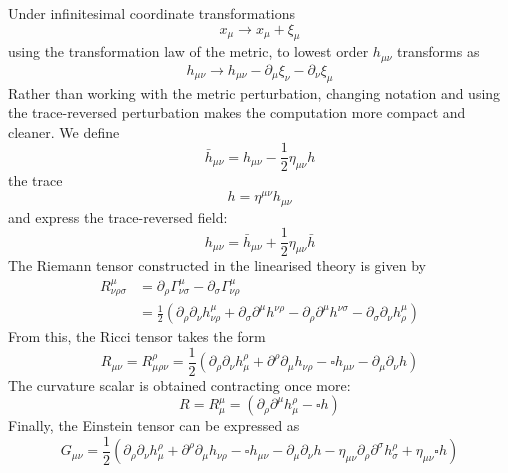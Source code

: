 \documentclass[binding=0.6cm, LaM]{sapthesis}
\begin{document}
	Under infinitesimal coordinate transformations
                 \[
			x_{\mu} \rightarrow x_{\mu} + \xi_{\mu}
                \]
	using the transformation law of the metric, to lowest order $h_{\mu\nu}$ transforms as	
		\[
			h_{\mu\nu} \rightarrow h_{\mu\nu} - \partial_{\mu}\xi_{\nu} - \partial_{\nu}\xi_{\mu}
		\]
	Rather than working with the metric perturbation, changing notation and using the trace-reversed perturbation 
	makes the computation more compact and cleaner. We define
		\begin{equation}
			{\bar h}_{\mu\nu} = h_{\mu\nu} - \frac{1}{2}\eta_{\mu\nu}h
		\end{equation}
	the trace
		\begin{equation}
			h = \eta^{\mu\nu}h_{\mu\nu}
		\end{equation}
	and express the trace-reversed field:
		\begin{equation}
			h_{\mu\nu} = {\bar h}_{\mu\nu} + \frac{1}{2}\eta_{\mu\nu}{\bar h}
		\end{equation}
	The Riemann tensor constructed in the linearised theory is given by
		\begin{align}
			R^{\mu}_{\nu\rho\sigma} &= \partial_{\rho} \Gamma^{\mu}_{\nu\sigma} - \partial_{\sigma}\Gamma^{\mu}_{\nu\rho}  \\
				       &= \frac{1}{2} (\partial_{\rho}\partial_{\nu}h^{\mu}_{\nu\rho} + \partial_{\sigma}\partial^{\mu}h^{\nu\rho} - \partial_{\rho}\partial^{\mu}h^{\nu\sigma} - \partial_{\sigma}\partial_{\nu}h^{\mu}_{\rho})
		\end{align}
	From this, the Ricci tensor takes the form
		\begin{equation}
			R_{\mu\nu} = R^{\rho}_{\mu\rho\nu} = \frac{1}{2}(\partial_{\rho}\partial_{\nu}h^{\rho}_{\mu} + \partial^{\rho}\partial_{\mu}h_{\nu\rho} - \square h_{\mu\nu} - \partial_{\mu}\partial_{\nu}h)
		\end{equation}
	The curvature scalar is obtained contracting once more:
		\begin{equation}
			R = R^{\mu}_{\mu} = (\partial_{\rho}\partial^{\mu}h^{\rho}_{\mu} - \square h)
		\end{equation}
	Finally, the Einstein tensor can be expressed as
		\begin{equation}
			G_{\mu\nu} = \frac{1}{2}(\partial_{\rho}\partial_{\nu}h^{\rho}_{\mu} + \partial^{\rho}\partial_{\mu}h_{\nu\rho} - \square h_{\mu\nu} - \partial_{\mu}\partial_{\nu}h - \eta_{\mu\nu}\partial_{\rho}\partial^{\sigma}h^{\rho}_{\sigma} + \eta_{\mu\nu}\square h)
		\end{equation}
\end{document}
